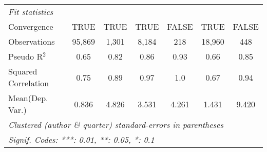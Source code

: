 \begin{tabular}{lcccccc}
   \midrule
   \emph{Fit statistics}\\
   Convergence                                                &TRUE           & TRUE          & TRUE          & FALSE   & TRUE          & FALSE\\  
   Observations                                               & 95,869        & 1,301         & 8,184         & 218     & 18,960        & 448\\  
   Pseudo R$^2$                                               & 0.65          & 0.82          & 0.86          & 0.93    & 0.66          & 0.85\\  
   Squared Correlation                                        & 0.75          & 0.89          & 0.97          & 1.0     & 0.67          & 0.94\\  
Mean(Dep. Var.) & 0.836 & 4.826 & 3.531 & 4.261 & 1.431 & 9.420 \\
   \midrule \midrule
   \multicolumn{7}{l}{\emph{Clustered (author \& quarter) standard-errors in parentheses}}\\
   \multicolumn{7}{l}{\emph{Signif. Codes: ***: 0.01, **: 0.05, *: 0.1}}\\
\end{tabular}
\par\endgroup
